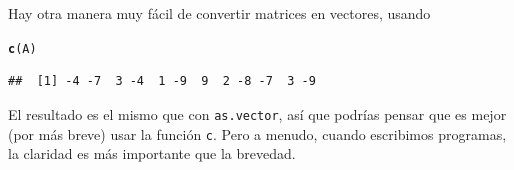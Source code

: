 \documentclass[10pt,a4paper]{article}\usepackage[]{graphicx}\usepackage[]{color}
\makeatletter
\newcommand{\hlstd}[1]{\textcolor[rgb]{0.345,0.345,0.345}{#1}}%
\newcommand{\hlkwd}[1]{\textcolor[rgb]{0.737,0.353,0.396}{\textbf{#1}}}%
\newenvironment{kframe}{%
 \def\at@end@of@kframe{}%
 \ifinner\ifhmode%
  \def\at@end@of@kframe{\end{minipage}}%
  \begin{minipage}{\columnwidth}%
 \fi\fi%
 \def\FrameCommand##1{\hskip\@totalleftmargin \hskip-\fboxsep
 \colorbox{shadecolor}{##1}\hskip-\fboxsep
     \hskip-\linewidth \hskip-\@totalleftmargin \hskip\columnwidth}%
 \MakeFramed {\advance\hsize-\width
   \@totalleftmargin\z@ \linewidth\hsize
   \@setminipage}}%
 {\par\unskip\endMakeFramed%
 \at@end@of@kframe}
\newenvironment{knitrout}{}{} %
\makeatother
\begin{document}
Hay otra manera muy fácil de convertir matrices en vectores, usando
\begin{knitrout}
\color{fgcolor}\begin{kframe}
\begin{alltt}
    \hlkwd{c}\hlstd{(A)}
\end{alltt}
\begin{verbatim}
##  [1] -4 -7  3 -4  1 -9  9  2 -8 -7  3 -9
\end{verbatim}
\end{kframe}
\end{knitrout}
El resultado es el mismo que con {\tt as.vector}, así que podrías pensar que es mejor (por más breve) usar la función {\tt c}. Pero a menudo, cuando escribimos programas, la claridad es más importante que la brevedad.
\end{document}
